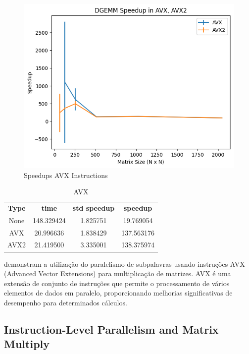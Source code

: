 \documentclass[12pt]{article}
\begin{document}
\begin{figure}[h]
    \centering
    \includegraphics[scale=0.75]{figures/speedups_avx.png}
    \caption{Speedups AVX Instructions}
    \label{fig:speedups-avx}
\end{figure}

\begin{table}[h]
    \centering
    \label{tab:avx}
    \begin{tabular}{cccc}
        \textbf{Type} & \textbf{time} & \textbf{std speedup} & \textbf{speedup} \\
        None & 148.329424 & 1.825751 & 19.769054 \\
        AVX &	20.996636	 &	1.838429 &	137.563176\\
        AVX2 &	21.419500	 &	3.335001 &	138.375974\\
    \end{tabular}
    \caption{AVX}
\end{table}

demonstram a utilização do paralelismo de subpalavras usando instruções AVX (Advanced Vector Extensions) para multiplicação de matrizes. AVX é uma extensão de conjunto de instruções que permite o processamento de vários elementos de dados em paralelo, proporcionando melhorias significativas de desempenho para determinados cálculos.

\subsection{Instruction-Level Parallelism and Matrix Multiply}
\end{document}
